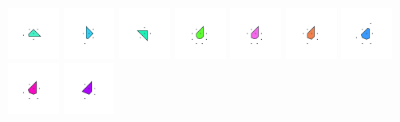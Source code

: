 \documentclass[text.tex]{subfiles}
\begin{document}
\begin{figure}[h!]
\includegraphics[width=0.12\textwidth]{img/results/circle8/circle8_223044_(65_-26alpha_1)_005.pdf}
\includegraphics[width=0.12\textwidth]{img/results/circle8/circle8_223044_(65_-26alpha_1)_006.pdf}
\includegraphics[width=0.12\textwidth]{img/results/circle8/circle8_223044_(65_-26alpha_1)_007.pdf}
\includegraphics[width=0.12\textwidth]{img/results/circle8/circle8_223044_(65_-26alpha_1)_008.pdf}
\includegraphics[width=0.12\textwidth]{img/results/circle8/circle8_223044_(65_-26alpha_1)_009.pdf}
\includegraphics[width=0.12\textwidth]{img/results/circle8/circle8_223044_(65_-26alpha_1)_010.pdf}
\includegraphics[width=0.12\textwidth]{img/results/circle8/circle8_223044_(65_-26alpha_1)_011.pdf}
\includegraphics[width=0.12\textwidth]{img/results/circle8/circle8_223044_(65_-26alpha_1)_012.pdf}
\includegraphics[width=0.12\textwidth]{img/results/circle8/circle8_223044_(65_-26alpha_1)_013.pdf}

\end{figure}
\end{document}
